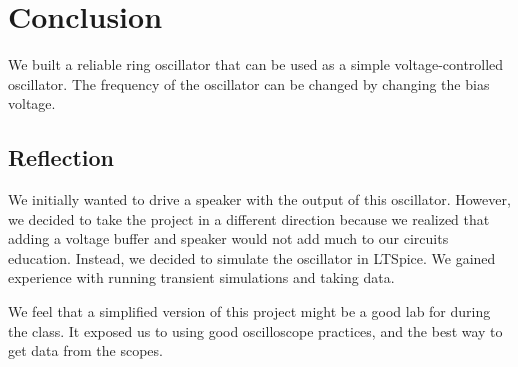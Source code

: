 \documentclass{article}
\begin{document}
\section{Conclusion}

We built a reliable ring oscillator that can be used as a simple voltage-controlled oscillator. The frequency of the oscillator can be changed by changing the bias voltage.

\subsection{Reflection}
We initially wanted to drive a speaker with the output of this oscillator. However, we decided to take the project in a different direction because we realized that adding a voltage buffer and speaker would not add much to our circuits education. Instead, we decided to simulate the oscillator in LTSpice. We gained experience with running transient simulations and taking data.

We feel that a simplified version of this project might be a good lab for during the class. It exposed us to using good oscilloscope practices, and the best way to get data from the scopes. 
\end{document}
